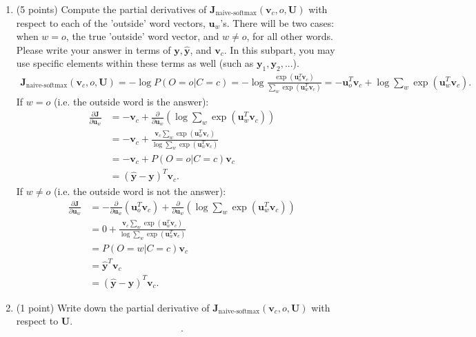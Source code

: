\documentclass{article}
\begin{document}
\begin{enumerate}[label=(\alph*)]
    \item (5 points) Compute the partial derivatives of $\bm{J}_{\text{naive-softmax}}(\bm{v}_c, o, \bm{U})$ with respect to each of the 'outside' word vectors, $\bm{u}_w$'s.
    There will be two cases: when $w=o$, the true 'outside' word vector, and $w\ne o$, for all other words.
    Please write your answer in terms of $\bm{y}, \hat{\bm{y}}$, and $\bm{v}_c$. In this subpart, you may use specific elements within these terms as well (such as $\bm{y}_1, \bm{y}_2, ...$).
    \begin{align*}
        \bm{J}_{\text{naive-softmax}}(\bm{v}_c, o, \bm{U}) = -\log P(O=o \vert C=c) = -\log \frac{\exp (\bm{u}_o^T \bm{v}_c)}{\sum_{w} \exp(\bm{u}_w^T \bm{v}_c)} = -\bm{u}_o^T \bm{v}_c + \log \sum_w \exp (\bm{u}_w^T \bm{v}_c).
    \end{align*}
    If $w=o$ (i.e. the outside word is the answer):
    \begin{align*}
        \frac{\partial \bm{J}}{\partial \bm{u}_w} &= -\bm{v}_c + \frac{\partial}{\partial \bm{u}_w} (\log \sum_w \exp (\bm{u}_w^T \bm{v}_c)) \\
        &= -\bm{v}_c + \frac{\bm{v}_c \sum_w \exp (\bm{u}_w^T \bm{v}_c)}{\log \sum_w \exp (\bm{u}_w^T \bm{v}_c)} \\
        &= -\bm{v}_c + P(O=o \vert C=c)\bm{v}_c\\
        &= (\hat{\bm{y}} - \bm{y})^T \bm{v}_c.
    \end{align*}
    If $w\ne o$ (i.e. the outside word is not the answer):
    \begin{align*}
        \frac{\partial \bm{J}}{\partial \bm{u}_w} &= -\frac{\partial}{\partial \bm{u}_w} (\bm{u}_o^T \bm{v}_c) + \frac{\partial}{\partial \bm{u}_w} (\log \sum_w \exp (\bm{u}_w^T \bm{v}_c)) \\
        &= 0 + \frac{\bm{v}_c \sum_w \exp (\bm{u}_w^T \bm{v}_c)}{\log \sum_w \exp (\bm{u}_w^T \bm{v}_c)} \\
        &= P(O=w \vert C=c) \bm{v}_c \\
        &= \hat{\bm{y}}^T \bm{v}_c \\ &= (\hat{\bm{y}} - \bm{y})^T \bm{v}_c.
    \end{align*}

    \item (1 point) Write down the partial derivative of $\bm{J}_{\text{naive-softmax}}(\bm{v}_c, o, \bm{U})$ with respect to $\bm{U}$.
    \begin{align*}
        .
    \end{align*}


\end{enumerate}
\end{document}
